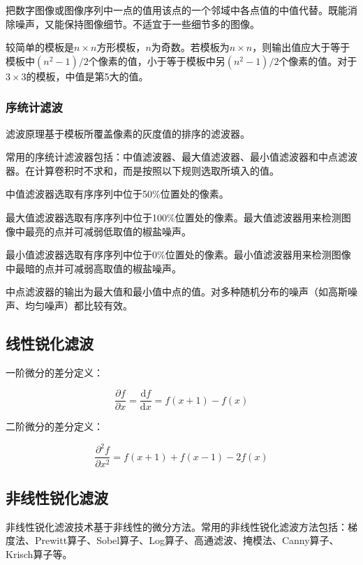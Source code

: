 \documentclass[cn, blue, normal, 12pt]{elegantnote}
\begin{document}
{把数字图像或图像序列中一点的值用该点的一个邻域中各点值的中值代替。既能消除噪声，又能保持图像细节。不适宜于一些细节多的图像。

较简单的模板是$n\times n$方形模板，$n$为奇数。若模板为$n\times n$，则输出值应大于等于模板中$(n^2-1)/2$个像素的值，小于等于模板中另$(n^2-1)/2$个像素的值。对于$3\times 3$的模板，中值是第5大的值。

\subsubsection{序统计滤波}

滤波原理基于模板所覆盖像素的灰度值的排序的滤波器。

常用的序统计滤波器包括：中值滤波器、最大值滤波器、最小值滤波器和中点滤波器。在计算卷积时不求和，而是按照以下规则选取所填入的值。

中值滤波器选取有序序列中位于50\%位置处的像素。

最大值滤波器选取有序序列中位于100\%位置处的像素。最大值滤波器用来检测图像中最亮的点并可减弱低取值的椒盐噪声。

最小值滤波器选取有序序列中位于0\%位置处的像素。最小值滤波器用来检测图像中最暗的点并可减弱高取值的椒盐噪声。

中点滤波器的输出为最大值和最小值中点的值。对多种随机分布的噪声（如高斯噪声、均匀噪声）都比较有效。

\subsection{线性锐化滤波}

一阶微分的差分定义：

\begin{equation}
    \frac{\partial f}{\partial x}=\frac{\mathrm{d}f}{\mathrm{d}x}=f(x+1)-f(x)
\end{equation}

二阶微分的差分定义：

\begin{equation}
    \frac{\partial^2 f}{\partial x^2}=f(x+1)+f(x-1)-2f(x)
\end{equation}

\subsection{非线性锐化滤波}

非线性锐化滤波技术基于非线性的微分方法。常用的非线性锐化滤波方法包括：梯度法、Prewitt算子、Sobel算子、Log算子、高通滤波、掩模法、Canny算子、Krisch算子等。

}
\end{document}
